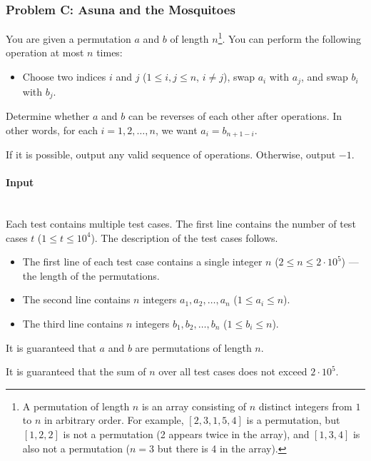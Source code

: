 \documentclass{article}
\begin{document}
\subsubsection{Problem C: Asuna and the Mosquitoes}

You are given a permutation $a$ and $b$ of length $n$\footnote{
A permutation of length $n$ is an array consisting of $n$ distinct integers from $1$ to $n$ in arbitrary order. For example, $[2,3,1,5,4]$ is a permutation, but $[1,2,2]$ is not a permutation (2 appears twice in the array), and $[1,3,4]$ is also not a permutation ($n = 3$ but there is 4 in the array).
}.
You can perform the following operation at most $n$ times:
\begin{itemize}
    \item Choose two indices $i$ and $j$ ($1 \le i, j \le n$, $i \ne j$), swap $a_i$ with $a_j$, and swap $b_i$ with $b_j$.
\end{itemize}

Determine whether $a$ and $b$ can be reverses of each other after operations. In other words, for each $i = 1, 2, \ldots, n$, we want $a_i = b_{n+1-i}$.

If it is possible, output any valid sequence of operations. Otherwise, output $-1$.

\paragraph{Input} \mbox{} \\

Each test contains multiple test cases. The first line contains the number of test cases $t$ ($1 \le t \le 10^4$). The description of the test cases follows.

\begin{itemize}
    \item The first line of each test case contains a single integer $n$ ($2 \le n \le 2 \cdot 10^5$) — the length of the permutations.
    \item The second line contains $n$ integers $a_1, a_2, \ldots, a_n$ ($1 \le a_i \le n$).
    \item The third line contains $n$ integers $b_1, b_2, \ldots, b_n$ ($1 \le b_i \le n$).
\end{itemize}

It is guaranteed that $a$ and $b$ are permutations of length $n$.

It is guaranteed that the sum of $n$ over all test cases does not exceed $2 \cdot 10^5$.
\end{document}
